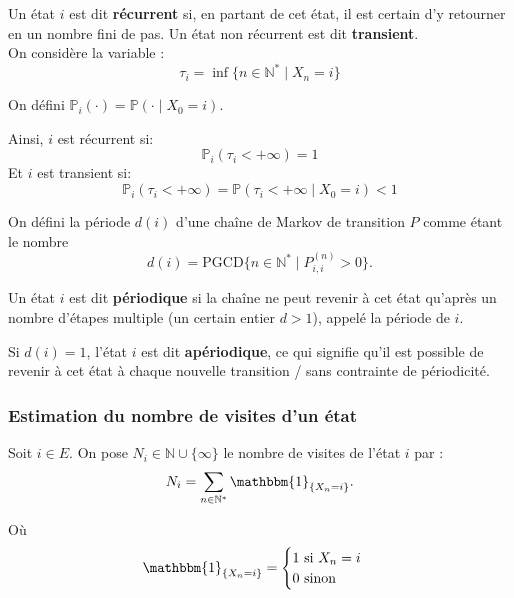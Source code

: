 \documentclass{article}
\begin{document}
\begin{tcolorbox}[colback=white,colframe=blue!80!black,title=État récurrent/transient]
Un état $i$ est dit \textbf{récurrent} si, en partant de cet état, il est certain d'y retourner en un nombre fini de pas. Un état non récurrent est dit \textbf{transient}. \\

On considère la variable :
\[
\tau_i = \inf\{n \in \mathbb{N}^{*} \mid X_n = i\}
\]

On défini $\mathbb{P}_i(\cdot) = \mathbb{P}(\cdot \mid X_0 = i)$.

Ainsi, $i$ est récurrent si:
\[
\mathbb{P}_i(\tau_i < +\infty) = 1
\]
Et $i$ est transient si:
\[
\mathbb{P}_i(\tau_i < +\infty) = \mathbb{P}(\tau_i < +\infty \mid X_0 = i) < 1
\]
\end{tcolorbox}

\begin{tcolorbox}[colback=white,colframe=blue!80!black,title=État périodique/apériodique]

On défini la période $d(i)$ d'une chaîne de Markov de transition $P$ comme étant le nombre
\[
d(i) = \text{PGCD}\{n \in \mathbb{N}^{*} \mid P_{i,i}^{(n)} > 0\}.
\]

Un état $i$ est dit \textbf{périodique} si la chaîne ne peut revenir à cet état qu'après un nombre d'étapes multiple (un certain entier $d > 1$), appelé la période de $i$.

Si $d(i) = 1$, l'état $i$ est dit \textbf{apériodique}, ce qui signifie qu'il est possible de revenir à cet état à chaque nouvelle transition /  sans contrainte de périodicité.
\end{tcolorbox}


\subsubsection{Estimation du nombre de visites d'un état}

\begin{tcolorbox}[colback=white,colframe=blue!80!black,title=Formule du nombre de visite d'un état]
Soit $i \in E$. On pose $N_i \in \mathbb{N}\cup \{\infty\} $ le nombre de visites de l'état $i$ par :
\[
N_i = \sum_{n \in \mathbb{N}^{*}} \mathbbm{1}_{\{X_n = i\}}.
\]

Où
\[
\mathbbm{1}_{\{X_n = i\}} = \begin{cases}
    1 \text{ si } X_n = i\\
    0 \text{ sinon} 
\end{cases}    
\]

\end{tcolorbox}
\end{document}
